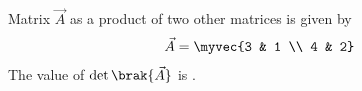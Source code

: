     \item Matrix $\vec{A}$ as a product of two other matrices is given by
    \begin{align*}
        \vec{A} = \myvec{3 & 1 \\ 4 & 2}
    \end{align*}
    The value of $\det\brak{\vec{A}}$ is \underline{\hspace{2cm}}.
    \hfill{}
